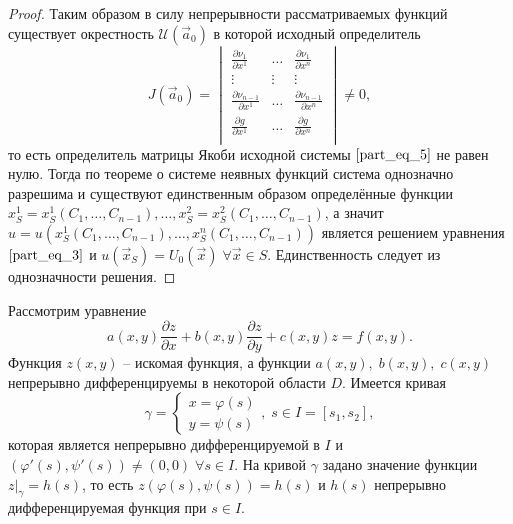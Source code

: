 \begin{proof}
    Таким образом в силу непрерывности рассматриваемых функций существует окрестность $\mathcal{U} \left( \vec{a}_0 \right)$ в которой исходный определитель
    \begin{equation*}
    	J \left( \vec{a}_0 \right) =
    	\begin{vmatrix}
    		\frac{\partial \nu_1}{\partial x^1} & \dots & \frac{\partial \nu_1}{\partial x^n}             \\
    		\vdots & \vdots & \vdots                                                                                         \\
    		\frac{\partial \nu_{n - 1}}{\partial x^1} & \dots & \frac{\partial \nu_{n - 1}}{\partial x^n} \\
    		\frac{\partial g}{\partial x^1} & \dots & \frac{\partial g}{\partial x^n}                     \\
    	\end{vmatrix} \neq 0,
    \end{equation*}
    то есть определитель матрицы Якоби исходной системы $\eqref{part_eq_5}$ не равен нулю. Тогда по теореме о системе неявных функций система однозначно разрешима и существуют единственным образом определённые функции $x^1_S = x^1_S \left( C_1, \dots, C_{n - 1} \right), \dots, x^2_S = x^2_S \left( C_1, \dots, C_{n - 1} \right)$, а значит $u = u \left( x^1_S \left( C_1, \dots, C_{n - 1} \right), \dots, x^n_S \left( C_1, \dots, C_{n - 1} \right) \right)$ является решением уравнения $\eqref{part_eq_3}$ и $u \left( \vec{x}_S \right) = U_0 \left( \vec{x} \right) \; \forall \vec{x} \in S$. Единственность следует из однозначности решения.
    
\end{proof}

Рассмотрим уравнение
\begin{equation}
a(x, y) \frac{\partial z}{\partial x} + b(x, y) \frac{\partial z}{\partial y} + c(x, y) z = f(x, y).
\label{part_eq_6}
\end{equation}
Функция $z(x, y)$ -- искомая функция, а функции $a(x, y), \; b(x, y), \; c(x, y)$ непрерывно дифференцируемы в некоторой области $D$. Имеется кривая 
\begin{equation*}
\gamma = 
\begin{cases}
	x = \varphi(s) \\
	y = \psi(s)
\end{cases}, \; s \in I = [s_1, s_2],
\end{equation*}
которая является непрерывно дифференцируемой в $I$ и $(\varphi'(s), \psi'(s)) \neq (0, 0) \; \forall s \in I$. На кривой $\gamma$ задано значение функции $z \big|_{\gamma} = h(s)$, то есть $z(\varphi(s), \psi(s)) = h(s)$ и $h(s)$ непрерывно дифференцируемая функция при $s \in I$.

